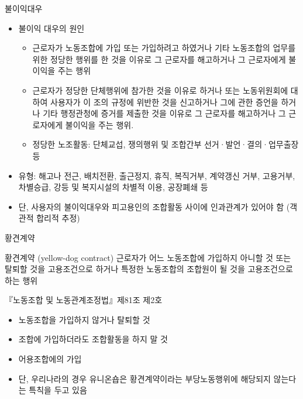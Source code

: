 \documentclass[aspectratio=169,xcolor=dvipsnames,handout]{beamer}
\begin{document}
\begin{frame}[allowframebreaks]{불이익대우}
    \begin{itemize}[<+->]
        \item 불이익 대우의 원인
        \begin{itemize}[<+->]
            \item 근로자가 노동조합에 가입 또는 가입하려고 하였거나 기타 노동조합의 업무를 위한 정당한 행위를 한 것을 이유로 그 근로자를 해고하거나 그 근로자에게 불이익을 주는 행위
            \item 근로자가 정당한 단체행위에 참가한 것을 이유로 하거나 또는 노동위원회에 대하여 사용자가 이 조의 규정에 위반한 것을 신고하거나 그에 관한 증언을 하거나 기타 행정관청에 증거를 제출한 것을 이유로 그 근로자를 해고하거나 그 근로자에게 불이익을 주는 행위.
            \item 정당한 노조활동: 단체교섭, 쟁의행위 및 조합간부 선거·발언·결의·업무출장 등
        \end{itemize}
    \item 유형: 해고나 전근, 배치전환, 출근정지, 휴직, 복직거부, 계약갱신 거부, 고용거부, 차별승급, 강등 및 복지시설의 차별적 이용, 공장폐쇄 등
    \item 단, 사용자의 불이익대우와 피고용인의 조합활동 사이에 인과관계가 있어야 함 (객관적 합리적 추정)
    \end{itemize}
\end{frame}

\begin{frame}{황견계약}
\begin{block}{황견계약 (yellow-dog contract)}
        근로자가 어느 노동조합에 가입하지 아니할 것 또는 탈퇴할 것을 고용조건으로 하거나 특정한 노동조합의 조합원이 될 것을 고용조건으로 하는 행위
    \end{block}
    \begin{exampleblock}{『노동조합 및 노동관계조정법』제81조 제2호}
        \begin{itemize}[<+->]
            \item 노동조합을 가입하지 않거나 탈퇴할 것
            \item 조합에 가입하더라도 조합활동을 하지 말 것
            \item 어용조합에의 가입
        \end{itemize}
    \end{exampleblock}
    \begin{itemize}[<+->]
        \item 단, 우리나라의 경우 유니온숍은 황견계약이라는 부당노동행위에 해당되지 않는다는 특칙을 두고 있음
    \end{itemize}
\end{frame}
\end{document}

